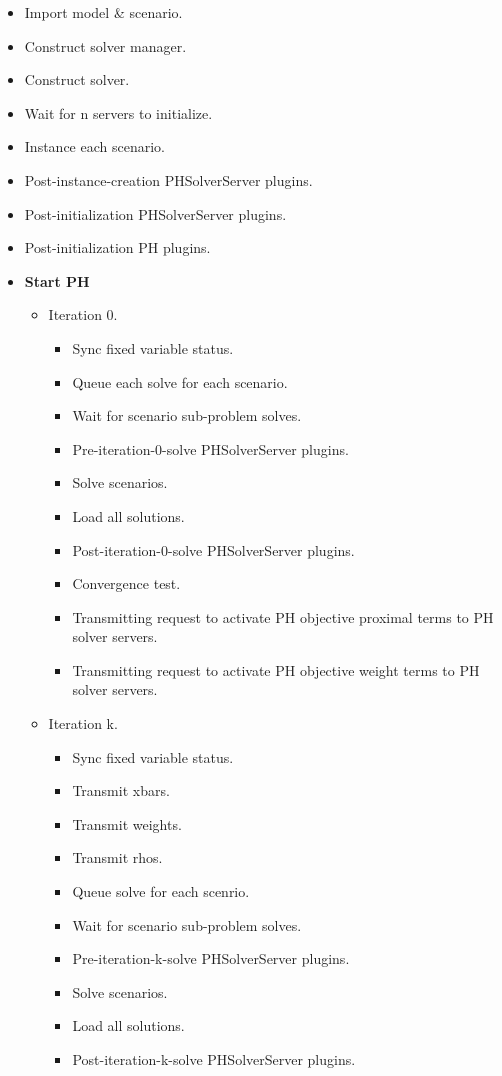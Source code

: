 \begin{itemize}
    \item Import model \& scenario.
    \item Construct solver manager.
    \item Construct solver.
    \item Wait for n servers to initialize.
    \item Instance each scenario.
    \item Post-instance-creation PHSolverServer plugins.
    \item Post-initialization PHSolverServer plugins.
    \item Post-initialization PH plugins.
    \item \textbf{Start PH}
    \begin{itemize}
        \item Iteration 0.
        \begin{itemize}
            \item Sync fixed variable status.
            \item Queue each solve for each scenario.
            \item Wait for scenario sub-problem solves.
            \item Pre-iteration-0-solve PHSolverServer plugins.
            \item Solve scenarios.
            \item Load all solutions.
            \item Post-iteration-0-solve PHSolverServer plugins.
            \item Convergence test.
            \item Transmitting request to activate PH objective proximal terms to PH solver servers.
            \item Transmitting request to activate PH objective weight terms to PH solver servers.
        \end{itemize}
        \item Iteration k.
        \begin{itemize}
            \item Sync fixed variable status.
            \item Transmit xbars.
            \item Transmit weights.
            \item Transmit rhos.
            \item Queue solve for each scenrio.
            \item Wait for scenario sub-problem solves.
            \item Pre-iteration-k-solve PHSolverServer plugins.
            \item Solve scenarios.
            \item Load all solutions.
            \item Post-iteration-k-solve PHSolverServer plugins.
        \end{itemize}
    \end{itemize}
\end{itemize}

